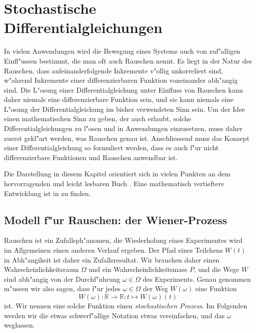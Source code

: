 %
%
\chapter{Stochastische Differentialgleichungen\label{chapter:stochastisch}}
\rhead{}
In vielen Anwendungen wird die Bewegung eines Systems auch von
zuf"alligen Einfl"ussen bestimmt, die man oft auch Rauschen nennt.
Es liegt in der Natur des Rauschen, dass aufeinanderfolgende Inkremente
v"ollig unkorreliert sind, w"ahrend Inkremente einer differenzierbaren
Funktion voneinander abh"angig sind.
Die L"osung einer Differentialgleichung unter Einfluss von Rauschen 
kann daher niemals eine differenzierbare Funktion sein, und sie kann
niemals eine L"osung der Differentialgleichung im bisher verwendeten
Sinn sein.
Um der Idee einen mathematischen Sinn zu geben, der auch erlaubt,
solche Differentialgleichungen zu l"osen und in Anwendungen
einzusetzen, muss daher zuerst gekl"art werden, was Rauschen genau ist.
Anschliessend muss das Konzept einer Differentialgleichung so formuliert
werden, dass es auch f"ur nicht differenzierbare Funktionen und Rauschen
anwendbar ist.

Die Darstellung in diesem Kapitel orientiert sich in vielen Punkten
an dem hervorragenden und leicht lesbaren Buch \cite{skript:evans}.
Eine mathematisch vertieftere Entwicklung ist in \cite{skript:oksendal}
zu finden.

%
%
\section{Modell f"ur Rauschen: der Wiener-Prozess\label{section:wiener}}
Rauschen ist ein Zufallsph"anomen, die Wiederholung eines Experimentes
wird im Allgemeinen einen anderen Verlauf ergeben.
Der Pfad eines Teilchens $W(t)$ in Abh"angikeit ist daher ein Zufallsresultat.
Wir brauchen daher einen Wahrscheinlichkeitsraum $\Omega$ und ein
Wahrscheinlichkeitsmass $P$, und die Wege $W$ sind abh"angig von 
der Durchf"uhrung $\omega\in\Omega$ des Experiments. 
Genau genommen m"ussen wir also sagen, dass f"ur jedes $\omega\in\Omega$
der Weg $W(\omega)$ eine Funktion
\[
W(\omega)\colon\mathbb R \to\mathbb R:t\mapsto W(\omega)(t)
\]
ist.
Wir nennen eine solche Funktion einen {\em stochastischen Prozess}.
Im Folgenden werden wir die etwas schwerf"allige Notation etwas
vereinfachen, und das $\omega$ weglassen.


